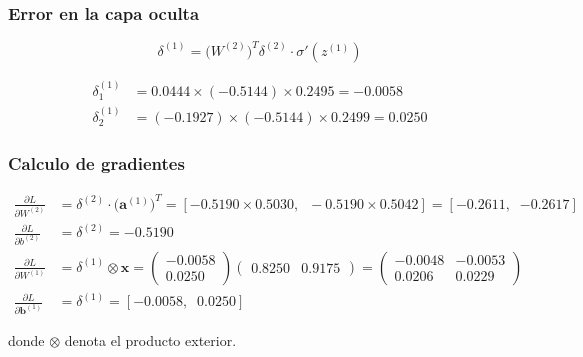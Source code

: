\documentclass{article}
\begin{document}
\subsubsection*{Error en la capa oculta}
\[
  \delta^{(1)} = \bigl(W^{(2)}\bigr)^T \delta^{(2)} \cdot \sigma'(z^{(1)})
\]
 
\begin{align*}
  \delta^{(1)}_1 &= 0.0444 \times (-0.5144) \times 0.2495 = \mathbf{-0.0058} \\
  \delta^{(1)}_2 &= (-0.1927) \times (-0.5144) \times 0.2499 = \mathbf{0.0250}
\end{align*}

\subsubsection*{Calculo de gradientes}
 
\begin{align*}
  \frac{\partial L}{\partial W^{(2)}} &= \delta^{(2)} \cdot \bigl(\mathbf{a}^{(1)}\bigr)^T
    = [-0.5190 \times 0.5030,\;\; -0.5190 \times 0.5042]
    = [\mathbf{-0.2611},\;\; \mathbf{-0.2617}] \\[4pt]
  \frac{\partial L}{\partial b^{(2)}} &= \delta^{(2)} = \mathbf{-0.5190} \\[8pt]
  \frac{\partial L}{\partial W^{(1)}} &= \delta^{(1)} \otimes \mathbf{x}
    = \begin{pmatrix} -0.0058 \\ 0.0250 \end{pmatrix}
      \begin{pmatrix} 0.8250 & 0.9175 \end{pmatrix}
    = \begin{pmatrix} -0.0048 & -0.0053 \\ 0.0206 & 0.0229 \end{pmatrix} \\[4pt]
  \frac{\partial L}{\partial \mathbf{b}^{(1)}} &= \delta^{(1)}
    = [\mathbf{-0.0058},\;\; \mathbf{0.0250}]
\end{align*}

donde $\otimes$ denota el producto exterior.
 
\end{document}
